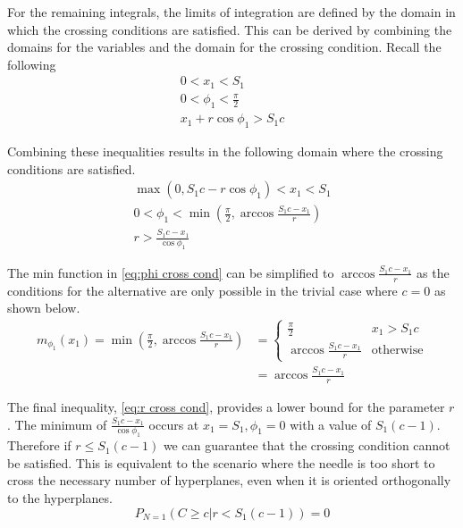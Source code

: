 \documentclass{article}
\begin{document}
For the remaining integrals, the limits of integration are defined by the domain in which the crossing conditions are satisfied. This
can be derived by combining the domains for the variables and the domain for the crossing condition. Recall the following
\begin{gather*}
	0 < x_1 < S_1 \\
	0 < \phi_1 < \frac{\pi}{2} \\
	x_1 + r\cos\phi_1 > S_1c
\end{gather*}

Combining these inequalities results in the following domain where the crossing conditions are satisfied.
\begin{gather}
	\max(0, S_1c-r\cos\phi_1) < x_1 < S_1 \label{eq:x cross cond} \\
	0 < \phi_1 < \min(\frac{\pi}{2}, \arccos\frac{S_1c-x_1}{r}) \label{eq:phi cross cond} \\
	r > \frac{S_1c - x_1}{\cos{\phi_1}} \label{eq:r cross cond}
\end{gather}

The min function in \ref{eq:phi cross cond} can be simplified to $\arccos\frac{S_1c-x_1}{r}$ as the conditions for the alternative are
only possible in the trivial case where $c=0$ as shown below.
\begin{align}
	m_{\phi_1}(x_1) = \min(\frac{\pi}{2}, \arccos\frac{S_1c-x_1}{r}) &= \begin{cases}
		\frac{\pi}{2} & x_1>S_1c \\
		\arccos\frac{S_1c-x_1}{r} & \text{otherwise}
	\end{cases} \\
	&= \arccos\frac{S_1c-x_1}{r} 
\end{align}

The final inequality, \ref{eq:r cross cond}, provides a lower bound for the parameter $r$. The minimum of $\frac{S_1c - x_1}{\cos{\phi_1}}$
occurs at $x_1=S_1, \phi_1=0$ with a value of $S_1(c-1)$. Therefore if $r\le S_1(c-1)$ we can guarantee that the crossing condition
cannot be satisfied. This is equivalent to the scenario where the needle is too short to cross the necessary number of hyperplanes, even when it is oriented
orthogonally to the hyperplanes.
\begin{equation}
	P_{N=1}(C\ge c|r<S_1(c-1)) = 0
\end{equation}
\end{document}
